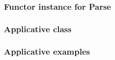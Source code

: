 \documentclass{beamer}
\begin{document}
\begin{frame}
  \frametitle{Functor instance for Parse}



\end{frame}




\begin{frame}
  \frametitle{Applicative class}



\end{frame}


\begin{frame}
  \frametitle{Applicative examples}



\end{frame}
\end{document}
